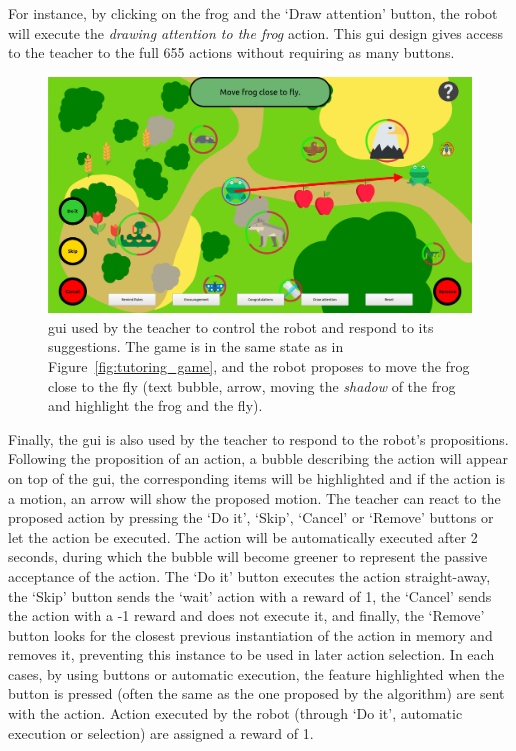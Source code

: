 For instance, by clicking on the frog and the `Draw attention' button, the robot will execute the \textit{drawing attention to the frog} action. 
This \gls{gui} design gives access to the teacher to the full 655 actions without requiring as many buttons. %

\begin{figure}[ht]
	\centering
	\includegraphics[width=1\textwidth]{gui.png}
	\caption{\gls{gui} used by the teacher to control the robot and respond to its suggestions. The game is in the same state as in Figure~\ref{fig:tutoring_game}, and the robot proposes to move the frog close to the fly (text bubble, arrow, moving the \textit{shadow} of the frog and highlight the frog and the fly).}
	\label{fig:tutoring_gui}
\end{figure}

Finally, the \gls{gui} is also used by the teacher to respond to the robot's propositions. Following the proposition of an action, a bubble describing the action will appear on top of the \gls{gui}, the corresponding items will be highlighted and if the action is a motion, an arrow will show the proposed motion. The teacher can react to the proposed action by pressing the `Do it', `Skip', `Cancel' or `Remove' buttons or let the action be executed. The action will be automatically executed after 2 seconds, during which the bubble will become greener to represent the passive acceptance of the action. The `Do it' button executes the action straight-away, the `Skip' button sends the `wait' action with a reward of 1, the `Cancel' sends the action with a -1 reward and does not execute it, and finally, the `Remove' button looks for the closest previous instantiation of the action in memory and removes it, preventing this instance to be used in later action selection. In each cases, by using buttons or automatic execution, the feature highlighted when the button is pressed (often the same as the one proposed by the algorithm) are sent with the action. Action executed by the robot (through `Do it', automatic execution or selection) are assigned a reward of 1.

